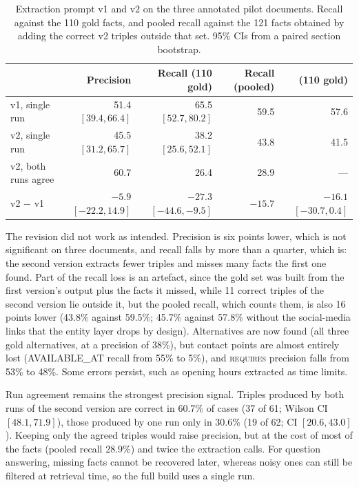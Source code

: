 \begin{table}[ht]
    \centering
    \footnotesize
    \caption{Extraction prompt v1 and v2 on the three annotated pilot documents.
             Recall against the 110 gold facts, and pooled recall against the 121 facts
             obtained by adding the correct v2 triples outside that set. 95\% CIs from a
             paired section bootstrap.}
    \label{tab:kg:v2}
    \setlength{\tabcolsep}{4pt}
    \begin{tabular}{lrrrr}
        \toprule
        & Precision & Recall (110 gold) & Recall (pooled) & \fone{} (110 gold) \\
        \midrule
        v1, single run           & 51.4 $[39.4, 66.4]$ & 65.5 $[52.7, 80.2]$ & 59.5 & 57.6 \\
        v2, single run           & 45.5 $[31.2, 65.7]$ & 38.2 $[25.6, 52.1]$ & 43.8 & 41.5 \\
        v2, both runs agree      & 60.7                & 26.4                & 28.9 & --- \\
        \midrule
        v2 $-$ v1                & $-5.9$ $[-22.2, 14.9]$ & $-27.3$ $[-44.6, -9.5]$ & $-15.7$ & $-16.1$ $[-30.7, 0.4]$ \\
        \bottomrule
    \end{tabular}
\end{table}

The revision did not work as intended. Precision is six points lower, which is not
significant on three documents, and recall falls by more than a quarter, which is: the
second version extracts fewer triples and misses many facts the first one found. Part of the
recall loss is an artefact, since the gold set was built from the first version's output
plus the facts it missed, while 11 correct triples of the second version lie outside it,
but the pooled recall, which counts them, is also 16 points lower (43.8\% against
59.5\%; 45.7\% against 57.8\% without the social-media links that the entity layer drops
by design). Alternatives are now found (all three gold alternatives, at a precision of
38\%), but contact points are almost entirely lost (AVAILABLE\_AT recall from 55\% to
5\%), and \textsc{requires} precision falls from 53\% to 48\%. Some errors persist, such
as opening hours extracted as time limits.

Run agreement remains the strongest precision signal. Triples produced by both runs of
the second version are correct in 60.7\% of cases (37 of 61; Wilson CI $[48.1,
71.9]$), those produced by one run only in 30.6\% (19 of 62; CI $[20.6, 43.0]$). Keeping
only the agreed triples would raise precision, but at the cost of most of the facts
(pooled recall 28.9\%) and twice the extraction calls. For question answering, missing
facts cannot be recovered later, whereas noisy ones can still be filtered at retrieval
time, so the full build uses a single run.

